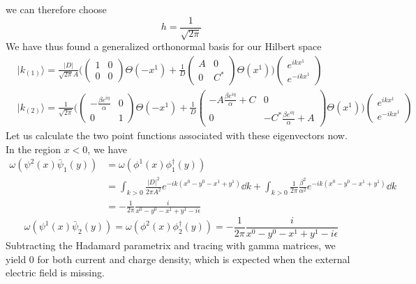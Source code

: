 we can therefore choose
\begin{equation*}
h = \frac{1}{\sqrt{2\pi}}
\end{equation*}
We have thus found a generalized orthonormal basis for our Hilbert space
\begin{equation}
\begin{split}
& | k_{(1)} \rangle = \frac{|D|}{\sqrt{2\pi}A}\bigg( \begin{pmatrix} 1 & 0 \\ 0 & 0 \end{pmatrix}
\Theta(-x^1) + 
\frac{1}{D}\begin{pmatrix} A & 0 \\  0 & C^* \end{pmatrix} \Theta(x^1) \bigg)
\begin{pmatrix} e^{ikx^1}  \\ e^{-ikx^1} \end{pmatrix}   \\
& | k_{(2)} \rangle = \frac{1}{\sqrt{2\pi}}
\Bigg( \begin{pmatrix} -\frac{\beta e^{i\eta}}{\alpha} & 0 \\ 0 & 1 \end{pmatrix}
\Theta(-x^1) + 
\frac{1}{D}\begin{pmatrix} -A\frac{\beta e^{i\eta}}{\alpha} + C  & 0\\ 0&  -C^*\frac{\beta e^{i\eta}}{\alpha} + A  \end{pmatrix} \Theta(x^1) \Bigg)
\begin{pmatrix} e^{ikx^1}  \\  e^{-ikx^1}  \end{pmatrix}  
\end{split}
\end{equation}
Let us calculate the two point functions associated with these eigenvectors now. In the region $x<0$, we have
\begin{equation*}
\begin{split}
\omega(\psi^2(x)\bar{\psi}_1(y)) & =  \omega(\phi^1(x)\phi^\dagger_1(y)) \\
& = \int_{k > 0} \frac{|D|^2}{2\pi A^2} e^{-ik(x^0 - y^0 - x^1 + y^1)} \dd k + \int_{k>0} \frac{1}{2\pi}  \frac{\beta^2}{\alpha^2} e^{-ik(x^0 - y^0 - x^1 + y^1)} \dd k\\
& = -\frac{1}{2\pi}\frac{i}{x^0 - y^0 - x^1 + y^1 - i\epsilon} 
\end{split}
\end{equation*}
\begin{equation*}
\omega(\psi^1(x)\bar{\psi}_2(y))   =  \omega(\phi^2(x)\phi^\dagger_2(y)) = -\frac{1}{2\pi}\frac{i}{x^0 - y^0 - x^1 + y^1 - i\epsilon} 
\end{equation*}
Subtracting the Hadamard parametrix and tracing with gamma matrices, we yield 0 for both current and charge density, which is expected when the external electric field is missing.





















